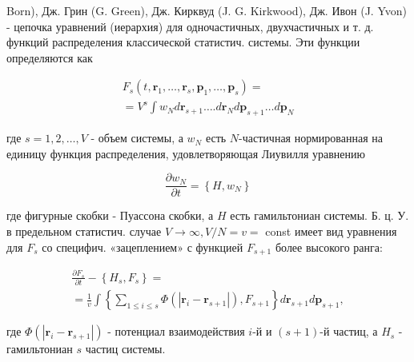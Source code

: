 \documentclass[10pt]{article}
\begin{document}
Born), Дж. Грин (G. Green), Дж. Кирквуд (J. G. Kirkwood), Дж. Ивон (J. Yvon) - цепочка уравнений (иерархия) для одночастичных, двухчастичных и т. д. функций распределения классической статистич. системы. Эти функции определяются как



\[

\begin{gathered}

F_{s}\left(t, \boldsymbol{r}_{1}, \ldots, \boldsymbol{r}_{s}, \boldsymbol{p}_{1}, \ldots, \boldsymbol{p}_{s}\right)= \\

=V^{s} \int w_{N} d \boldsymbol{r}_{s+1} \ldots . d \boldsymbol{r}_{N} d \boldsymbol{p}_{s+1} \ldots d \boldsymbol{p}_{N}

\end{gathered}

\]



где $s=1,2, \ldots, V$ - объем системы, а $w_{N}$ есть $N$-частичная нормированная на единицу функция распределения, удовлетворяющая Лиувилля уравнению



\[

\frac{\partial w_{N}}{\partial t}=\left\{H, w_{N}\right\}

\]



где фигурные скобки - Пуассона скобки, а $H$ есть гамильтониан системы. Б. ц. У. в предельном статистич. случае $V \rightarrow \infty, V / N=v=$ const имеет вид уравнения для $F_{s}$ со специфич. «зацеплением» с функцией $F_{s+1}$ более высокого ранга:



\[

\begin{gathered}

\frac{\partial F_{s}}{\partial t}-\left\{H_{s}, F_{s}\right\}= \\

=\frac{1}{v} \int\left\{\sum_{1 \leqslant i \leqslant s} \Phi\left(\left|\boldsymbol{r}_{i}-\boldsymbol{r}_{s+1}\right|\right), F_{s+1}\right\} d \boldsymbol{r}_{s+1} d \boldsymbol{p}_{s+1},

\end{gathered}

\]



где $\Phi\left(\left|\boldsymbol{r}_{i}-\boldsymbol{r}_{s+1}\right|\right)$ - потенциал взаимодействия $i$-й и $(s+1)$-й частиц, а $H_{s}$ - гамильтониан $s$ частиц системы.
\end{document}
